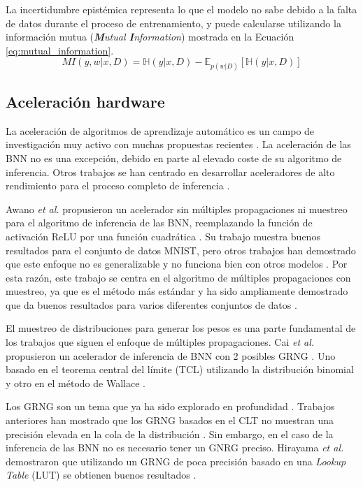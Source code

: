 La incertidumbre epistémica representa lo que el modelo no sabe debido a la falta de datos durante el proceso de entrenamiento, y puede calcularse utilizando la información mutua (\textit{\textbf{M}utual \textbf{I}nformation}) mostrada en la Ecuación \ref{eq:mutual_information}.
\begin{equation} \label{eq:mutual_information}
MI(y,w|x,D) = \mathbb{H}(y|x,D) - \mathbb{E}_{p(w|D)}[\mathbb{H}(y|x,D)]
\end{equation}

\subsection{Aceleración hardware}

La aceleración de algoritmos de aprendizaje automático es un campo de investigación muy activo con muchas propuestas recientes \cite{survey_ai22}. La aceleración de las BNN no es una excepción, debido en parte al elevado coste de su algoritmo de inferencia. Otros trabajos se han centrado en desarrollar aceleradores de alto rendimiento para el proceso completo de inferencia \cite{bnn_grng_accel, sampling_free_bnn_accel, bnn_clt_approx}.

Awano \emph{et al.} propusieron un acelerador sin múltiples propagaciones ni muestreo para el algoritmo de inferencia de las BNN, reemplazando la función de activación ReLU por una función cuadrática \cite{sampling_free_bnn_accel}. Su trabajo muestra buenos resultados para el conjunto de datos MNIST, pero otros trabajos han demostrado que este enfoque no es generalizable y no funciona bien con otros modelos \cite{bnn_clt_approx}. Por esta razón, este trabajo se centra en el algoritmo de múltiples propagaciones con muestreo, ya que es el método más estándar y ha sido ampliamente demostrado que da buenos resultados para varios diferentes conjuntos de datos \cite{bnn_grng_accel, bnn_clt_approx, bnn_hyper_uncertainty}.

El muestreo de distribuciones para generar los pesos es una parte fundamental de los trabajos que siguen el enfoque de múltiples propagaciones. Cai \emph{et al.} propusieron un acelerador de inferencia de BNN con 2 posibles GRNG \cite{bnn_grng_accel}. Uno basado en el teorema central del límite (TCL) utilizando la distribución binomial y otro en el método de Wallace \cite{wallace_grng}.

Los GRNG son un tema que ya ha sido explorado en profundidad \cite{grng_survey}. Trabajos anteriores han mostrado que los GRNG basados en el CLT no muestran una precisión elevada en la cola de la distribución \cite{clt_grng}. Sin embargo, en el caso de la inferencia de las BNN no es necesario tener un GNRG preciso. Hirayama \emph{et al.} demostraron que utilizando un GRNG de poca precisión basado en una \textit{Lookup Table} (LUT) se obtienen buenos resultados \cite{bnn_lut_grng}.

